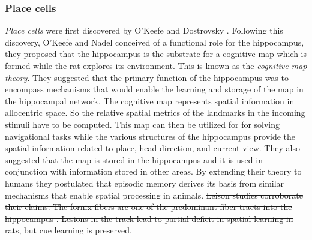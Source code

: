 \subsubsection{Place cells}
\label{placeCells}
 \emph{Place cells} were first discovered by O'Keefe and Dostrovsky \cite{O'Keefe1971a}. Following this discovery, O'Keefe and Nadel \cite{Street}  conceived of a functional role for the hippocampus, they proposed that the hippocampus is the substrate for a cognitive map which is formed while the rat explores its environment. This is known as the \emph{cognitive map theory}. They suggested that the primary function of the hippocampus was to encompass mechanisms that would enable the learning and storage of the map in the hippocampal network. The cognitive map represents spatial information in allocentric space. So the relative spatial metrics of the landmarks in the incoming stimuli have to be computed. This map can then be utilized for for solving navigational tasks while the various structures of the hippocampus provide the spatial information related to place, head direction, and current view. They also suggested that the map is stored in the hippocampus and it is used in conjunction with information stored in other areas. By extending their theory to humans they postulated that episodic memory derives its basis from similar mechanisms that enable spatial processing in animals. \st{Leison studies corroborate their claims. The fornix fibers are one of the predominant fiber tracts into the hippocampus . Lesions in the track lead to partial deficit in spatial learning in rats, but cue learning is preserved.}\\
 
